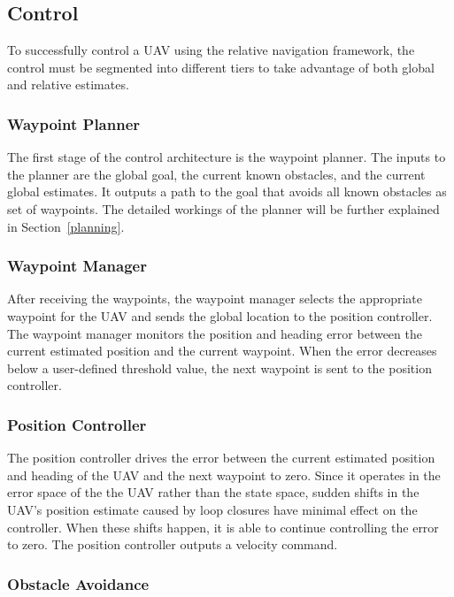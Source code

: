 \documentclass[letterpaper, 10 pt, conference]{ieeeconf}  %
\begin{document}
\subsection{Control}

To successfully control a UAV using the relative navigation framework, the control must be segmented into different tiers to take advantage of both global and relative estimates.

\subsubsection{Waypoint Planner}

The first stage of the control architecture is the waypoint planner. The inputs to the planner are the global goal, the current known obstacles, and the current global estimates. It outputs a path to the goal that avoids all known obstacles as set of waypoints. The detailed workings of the planner will be further explained in Section~\ref{planning}.

\subsubsection{Waypoint Manager}

After receiving the waypoints, the waypoint manager selects the appropriate waypoint for the UAV and sends the global location to the position controller. The waypoint manager monitors the position and heading error between the current estimated position and the current waypoint. When the error decreases below a user-defined threshold value, the next waypoint is sent to the position controller.

\subsubsection{Position Controller}

The position controller drives the error between the current estimated position and heading of the UAV and the next waypoint to zero. Since it operates in the error space of the the UAV rather than the state space, sudden shifts in the UAV's position estimate caused by loop closures have minimal effect on the controller. When these shifts happen, it is able to continue controlling the error to zero. The position controller outputs a velocity command.

\subsubsection{Obstacle Avoidance} \label{obs_avoid}
\end{document}
